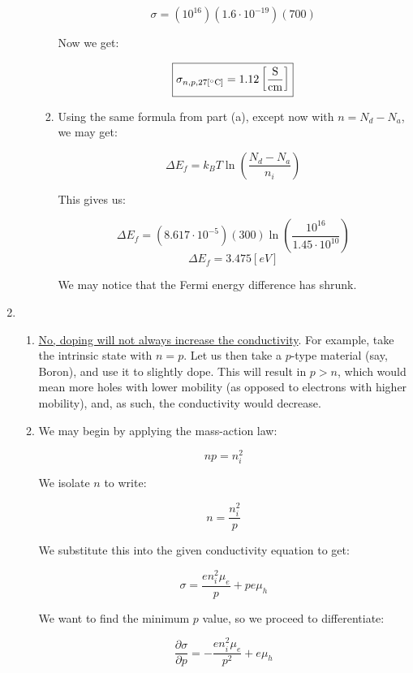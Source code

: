 \begin{enumerate}
\begin{enumerate}[label=\alph*.]
\begin{enumerate}[label=\arabic*.]
            $$\sigma=(10^{16})(1.6\cdot10^{-19})(700)$$
            
            Now we get:

            $$\boxed{\sigma_{n,p,27[\si{\celsius}]}=1.12\left[ \si{\siemens\over\centi\meter} \right]}$$

          \item Using the same formula from part (a), except now with $n=N_d-N_a$, we may get:

            $$\Delta E_f=k_BT\ln\left( \frac{N_d-N_a}{n_i} \right)$$

            This gives us:

            $$\Delta E_f=\left( 8.617\cdot10^{-5} \right)(300)\ln\left( \frac{10^{16}}{1.45\cdot10^{10}} \right)$$
            $$\boxed{\Delta E_f=3.475[\si{eV}]}$$

            We may notice that the Fermi energy difference has shrunk.

        \end{enumerate}

    \end{enumerate}

    \setcounter{enumi}{5}

  \item

    \begin{enumerate}[label=\alph*]

      \item \underline{No, doping will not always increase the conductivity}. For example, take the intrinsic state with $n=p$. Let us then take a $p$-type material (say, Boron), and use it to slightly dope. This will result in $p>n$, which would mean more holes with lower mobility (as opposed to electrons with higher mobility), and, as such, the conductivity would decrease.

      \item We may begin by applying the mass-action law:

        $$np=n_i^2$$

        We isolate $n$ to write:

        $$n=\frac{n_i^2}{p}$$

        We substitute this into the given conductivity equation to get:

        $$\sigma=\frac{en_i^2\mu_e}{p}+pe\mu_h$$

        We want to find the minimum $p$ value, so we proceed to differentiate:

        $$\frac{\partial\sigma}{\partial p}=-\frac{en_i^2\mu_e}{p^2}+e\mu_h$$


\end{enumerate}
\end{enumerate}
